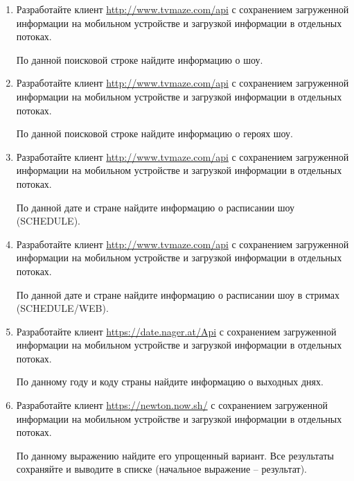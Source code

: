\begin{enumerate}
	\item Разработайте клиент \url{http://www.tvmaze.com/api} с сохранением загруженной информации на мобильном устройстве и загрузкой
		информации в отдельных потоках.

		По данной поисковой строке найдите информацию о шоу.

	\item Разработайте клиент \url{http://www.tvmaze.com/api} с сохранением загруженной информации на мобильном устройстве и загрузкой
		информации в отдельных потоках.

		По данной поисковой строке найдите информацию о героях шоу.

	\item Разработайте клиент \url{http://www.tvmaze.com/api} с сохранением загруженной информации на мобильном устройстве и загрузкой
		информации в отдельных потоках.

		По данной дате и стране найдите информацию о расписании шоу (SCHEDULE).

	\item Разработайте клиент \url{http://www.tvmaze.com/api} с сохранением загруженной информации на мобильном устройстве и загрузкой
		информации в отдельных потоках.

		По данной дате и стране найдите информацию о расписании шоу в стримах (SCHEDULE/WEB).






	\item Разработайте клиент \url{https://date.nager.at/Api} с сохранением загруженной информации на мобильном устройстве и загрузкой
		информации в отдельных потоках. 

		По данному году и коду страны найдите информацию о выходных днях.


	\item Разработайте клиент \url{https://newton.now.sh/} с сохранением загруженной информации на мобильном устройстве и загрузкой
		информации в отдельных потоках. 

		По данному выражению найдите его упрощенный вариант. Все результаты сохраняйте и выводите в списке (начальное выражение -- результат).




\end{enumerate}
